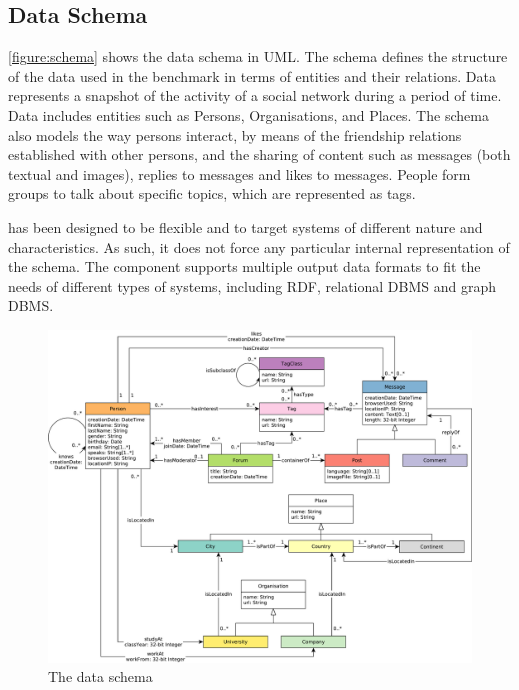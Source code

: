 \subsection{Data Schema}

\autoref{figure:schema} shows the data schema in UML. The schema defines the
structure of the data used in the benchmark in terms of entities and their
relations. Data represents a snapshot of the activity of a social network
during a period of time. Data includes entities such as Persons, Organisations,
and Places. The schema also models the way persons interact, by means of the
friendship relations established with other persons, and the sharing of content
such as messages (both textual and images), replies to messages and likes to
messages.  People form groups to talk about specific topics, which are
represented as tags.

\ldbcsnb has been designed to be flexible and to target systems of different
nature and characteristics. As such, it does not force any particular internal
representation of the schema. The \datagen component
supports multiple output data formats to
fit the needs of different types of systems, including RDF, relational DBMS and
graph DBMS.


\begin{figure}[htbp]
	\centering
	\includegraphics[width=\linewidth]{figures/schema}
	\caption{The \ldbcsnb data schema}
	\label{figure:schema}
\end{figure}

